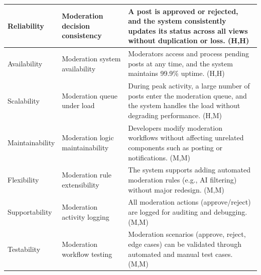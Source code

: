 \documentclass{article}
\begin{document}
\begin{table}[H]
\begin{tabular}{|p{3cm}|p{4cm}|p{7cm}|}
        Reliability
                                   & Moderation decision consistency
                                   & A post is approved or rejected, and the system consistently updates its status across all views without duplication or loss. (H,H)                            \\
        \hline

        Availability
                                   & Moderation system availability
                                   & Moderators access and process pending posts at any time, and the system maintains 99.9\% uptime. (H,H)                                                        \\
        \hline

        Scalability
                                   & Moderation queue under load
                                   & During peak activity, a large number of posts enter the moderation queue, and the system handles the load without degrading performance. (H,M)                \\
        \hline

        Maintainability
                                   & Moderation logic maintainability
                                   & Developers modify moderation workflows without affecting unrelated components such as posting or notifications. (M,M)                                         \\
        \hline

        Flexibility
                                   & Moderation rule extensibility
                                   & The system supports adding automated moderation rules (e.g., AI filtering) without major redesign. (M,M)                                                      \\
        \hline

        Supportability
                                   & Moderation activity logging
                                   & All moderation actions (approve/reject) are logged for auditing and debugging. (M,M)                                                                          \\
        \hline

        Testability
                                   & Moderation workflow testing
                                   & Moderation scenarios (approve, reject, edge cases) can be validated through automated and manual test cases. (M,M)                                            \\
        \hline
    \end{tabular}
\end{table}
\end{document}
